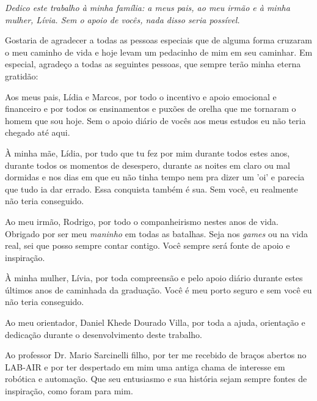 \fi
\begin{dedicatoria}
   \vspace*{\fill}
   \centering
   \noindent
   \textit{Dedico este trabalho à minha família: a meus pais, ao meu irmão e à minha mulher, Lívia. Sem o apoio de vocês, nada disso seria possível.} \vspace*{\fill}
\end{dedicatoria}


\begin{agradecimentos}

Gostaria de agradecer a todas as pessoas especiais que de alguma forma cruzaram o meu caminho de vida e hoje levam um pedacinho de mim em seu caminhar. Em especial, agradeço a todas as seguintes pessoas, que sempre terão minha eterna gratidão:

Aos meus pais, Lídia e Marcos, por todo o incentivo e apoio emocional e financeiro e por todos os ensinamentos e puxões de orelha que me tornaram o homem que sou hoje. Sem o apoio diário de vocês aos meus estudos eu não teria chegado até aqui. 

À minha mãe, Lídia, por tudo que tu fez por mim durante todos estes anos, durante todos os momentos de desespero, durante as noites em claro ou mal dormidas e nos dias em que eu não tinha tempo nem pra dizer um 'oi' e parecia que tudo ia dar errado. Essa conquista também é sua. Sem você, eu realmente não teria conseguido.

Ao meu irmão, Rodrigo, por todo o companheirismo nestes anos de vida. Obrigado por ser meu \textit{maninho} em todas as batalhas. Seja nos \textit{games} ou na vida real, sei que posso sempre contar contigo. Você sempre será fonte de apoio e inspiração.

À minha mulher, Lívia, por toda compreensão e pelo apoio diário durante estes últimos anos de caminhada da graduação. Você é meu porto seguro e sem você eu não teria conseguido.

Ao meu orientador, Daniel Khede Dourado Villa, por toda a ajuda, orientação e dedicação durante o desenvolvimento deste trabalho.

Ao professor Dr. Mario Sarcinelli filho, por ter me recebido de braços abertos no LAB-AIR e por ter despertado em mim uma antiga chama de interesse em robótica e automação. Que seu entusiasmo e sua história sejam sempre fontes de inspiração, como foram para mim.


\end{agradecimentos}
